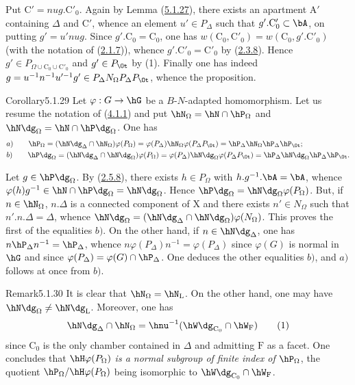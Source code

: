 \documentclass[12pt,a4paper,oneside,english]{smfart}
\makeatletter
\newcommand{\btanchor}[1]{\leavevmode\Hy@raisedlink{\hypertarget{bt:#1}{}}}
\newcommand{\btpageanchor}[1]{\Hy@raisedlink{\hypertarget{p:#1}{}}}
\newcommand{\btref}[1]{\hyperlink{bt:#1}{#1}}
\newcommand{\btpage}[1]{\marginnote{p.~#1}\btpageanchor{#1}}
\newcommand{\pg}[1]{\btpage{#1}}
\theoremstyle{definition}
\theoremstyle{bt}
\makeatother
\begin{document}
Put $\mathrm{C}'=nug.\mathrm{C}'_{0}$. Again by Lemma (\btref{5.1.27}), there exists an
apartment $\mathrm{A}'$ containing $\Delta$ and $\mathrm{C}'$, whence an element
$u'\in P_{\Delta}$ such that $g'.\mathrm{C}'_{0}\subset\bA$, on putting
$g'=u'nug$. Since $g'.\mathrm{C}_{0}=\mathrm{C}_{0}$, one has
$w(\mathrm{C}_{0},\mathrm{C}'_{0})=w(\mathrm{C}_{0},g'.\mathrm{C}'_{0})$ (with
the notation of (\btref{2.1.7})), whence $g'.\mathrm{C}'_{0}=\mathrm{C}'_{0}$ by
(\btref{2.3.8}). Hence $g'\in P_{\Omega\cup \mathrm{C}_{0}\cup \mathrm{C}'_{0}}$ and
$g'\in P_{\Ot}$ by (1). Finally one has indeed
$g=u^{-1}n^{-1}u'^{-1}g'\in P_{\Delta}N_{\Omega}P_{\Delta}P_{\Ot}$, whence the
proposition.

\begin{btstat}{Corollary}{5.1.29}\btanchor{5.1.29}
Let $\varphi:G\to\hG$ be a $B$-$N$-adapted homomorphism. Let us resume the
notation of \textup{(\btref{4.1.1})} and put $\hN_{\Omega}=\hN\cap\hP_{\Omega}$ and
$\hN\dg_{\Omega}=\hN\cap\hP\dg_{\Omega}$. One has
\begin{align*}
&a)\qquad \hP_{\Omega}=(\hN\dg_{\Delta}\cap\hN_{\Omega})\varphi(P_{\Omega})
=\varphi(P_{\Delta})\hN_{\Omega}\varphi(P_{\Delta}P_{\Ot})
=\hP_{\Delta}\hN_{\Omega}\hP_{\Delta}\hP_{\Ot};\\
&b)\qquad \hP\dg_{\Omega}=(\hN\dg_{\Delta}\cap\hN\dg_{\Omega})\varphi(P_{\Omega})
=\varphi(P_{\Delta})\hN\dg_{\Omega}\varphi(P_{\Delta}P_{\Ot})
=\hP_{\Delta}\hN\dg_{\Omega}\hP_{\Delta}\hP_{\Ot}.
\end{align*}
\end{btstat}

Let $g\in\hP\dg_{\Omega}$. By (\btref{2.5.8}), there exists $h\in P_{\Omega}$ with
$h.g^{-1}.\bA=\bA$, whence
$\varphi(h)g^{-1}\in\hN\cap\hP\dg_{\Omega}=\hN\dg_{\Omega}$. Hence
$\hP\dg_{\Omega}=\hN\dg_{\Omega}\varphi(P_{\Omega})$. But, if
$n\in\hN_{\Omega}$, $n.\Delta$ is a connected component of $\mathrm{X}$ and
there exists $n'\in N_{\Omega}$ such that $n'.n.\Delta=\Delta$, whence
$\hN\dg_{\Omega}=(\hN\dg_{\Delta}\cap\hN\dg_{\Omega})\varphi(N_{\Omega})$. This
proves the first of the equalities $b)$. On the other hand, if
$n\in\hN\dg_{\Delta}$, one has $n\hP_{\Delta}n^{-1}=\hP_{\Delta}$, whence
$n\varphi(P_{\Delta})n^{-1}=\varphi(P_{\Delta})$ since $\varphi(G)$ is normal in
$\hG$ and since $\varphi(P_{\Delta})=\varphi(G)\cap\hP_{\Delta}$. One deduces
the other equalities $b)$, and $a)$ follows at once from $b)$.

\pg{95}
\begin{btstat}{Remark}{5.1.30}\btanchor{5.1.30}
\upshape
It is clear that $\hN_{\Omega}=\hN_{\mathrm{L}}$. On the other hand, one may
have $\hN\dg_{\Omega}\neq\hN\dg_{\mathrm{L}}$. Moreover, one has
\begin{equation*}
\hN\dg_{\Delta}\cap\hN_{\Omega}
=\hnu^{-1}(\hW\dg_{\mathrm{C}_{0}}\cap\hW_{\mathrm{F}})\tag{1}
\end{equation*}
since $\mathrm{C}_{0}$ is the only chamber contained in $\Delta$ and admitting
$\mathrm{F}$ as a facet. One concludes that \emph{$\hH\varphi(P_{\Omega})$ is a
normal subgroup of finite index of $\hP_{\Omega}$}, the quotient
$\hP_{\Omega}/\hH\varphi(P_{\Omega})$ being isomorphic to
$\hW\dg_{\mathrm{C}_{0}}\cap\hW_{\mathrm{F}}$.
\end{btstat}
\end{document}
